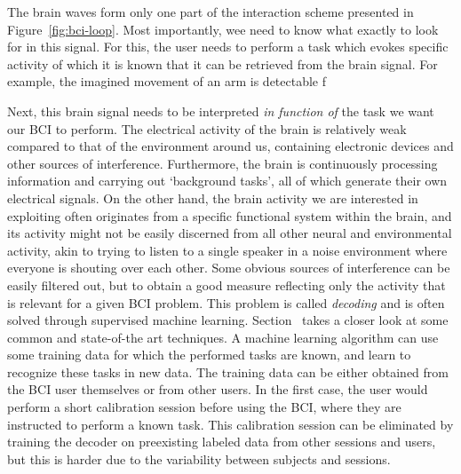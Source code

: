 The brain waves form only one part of the interaction scheme presented
in Figure~\ref{fig:bci-loop}.
Most importantly, wee need to know what exactly to look for in this signal.
For this, the user needs to perform a task which evokes specific activity of
which it is known that it can be retrieved from the brain signal.
For example, the imagined movement of an arm is detectable f

Next, this brain signal needs to be interpreted \emph{in function of} the
task we want our BCI to perform.
The electrical activity of the brain is relatively weak compared to that of the
environment around us, containing electronic devices and other sources of
interference.
Furthermore, the brain is continuously processing information and carrying out
`background tasks', all of which generate their own electrical signals.
On the other hand, the brain activity we are interested in exploiting often
originates from a specific functional system within the brain, and its activity
might not be easily discerned from all other neural and environmental activity,
akin to trying to listen to a single speaker in a noise environment where
everyone is shouting over each other.
Some obvious sources of interference can be easily filtered out, but to obtain
a good measure reflecting only the activity that is relevant for a given BCI
problem.
This problem is called \emph{decoding} and is often solved through supervised
machine learning.
Section~\label{sec:bci-decoding} takes a closer look at some common and
state-of-the art techniques.
A machine learning algorithm can use some training data for which the performed
tasks are known, and learn to recognize these tasks in new data.
The training data can be either obtained from the BCI user themselves or from
other users.
In the first case, the user would perform a short calibration session before
using the BCI, where they are instructed to perform a known task.
This calibration session can be eliminated by training the decoder on
preexisting labeled data from other sessions and users, but this is harder due
to the variability between subjects and sessions.

